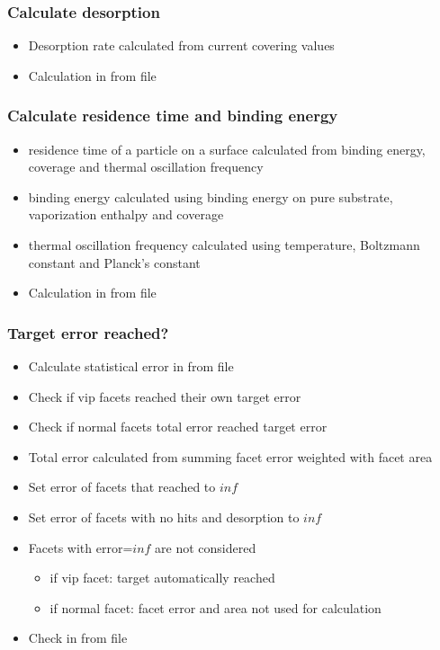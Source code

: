 \subsubsection{Calculate desorption}
\begin{itemize}[noitemsep,topsep=0pt, partopsep=0pt]
\item Desorption rate calculated from current covering values
\item Calculation in   from  file
\end{itemize}

\subsubsection{Calculate residence time and binding energy}
\begin{itemize}[noitemsep,topsep=0pt, partopsep=0pt]
\item residence time of a particle on a surface calculated from binding energy, coverage and thermal oscillation frequency
\item binding energy calculated using binding energy on pure substrate, vaporization enthalpy and coverage
\item thermal oscillation frequency calculated using temperature, Boltzmann constant and Planck's constant
\item Calculation in   from  file
\end{itemize}

\subsubsection{Target error reached?}
\begin{itemize}[noitemsep,topsep=0pt, partopsep=0pt]
\item Calculate statistical error in  from  file
\item Check if vip facets reached their own target error
\item Check if normal facets total error reached target error
\item Total error calculated from summing facet error weighted with facet area
\item Set error of facets that reached  to $inf$
\item Set error of facets with no hits and desorption to $inf$
\item Facets with error=$inf$ are not considered
\begin{itemize}[noitemsep,topsep=0pt, partopsep=0pt]
\item if vip facet: target automatically reached
\item if normal facet: facet error and area not used for calculation
\end{itemize}
\item Check in  from  file
\end{itemize}

